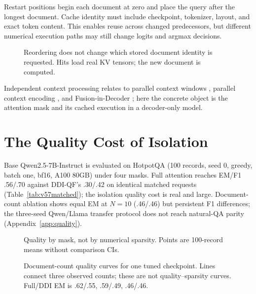 Restart positions begin each document at zero and place the query after
the longest document. Cache identity must include checkpoint, tokenizer,
layout, and exact token content. This enables reuse across changed
predecessors, but different numerical execution paths may still change
logits and argmax decisions.

\begin{figure}[H]
\centering\resizebox{.88\linewidth}{!}{}
\caption{Reordering does not change which stored document identity is
requested. Hits load real KV tensors; the new document is computed.}
\label{fig:requests}
\end{figure}

Independent context processing relates to parallel context windows
\citep{ratner2023pcw}, parallel context encoding \citep{yen2024cepe}, and
Fusion-in-Decoder \citep{izacard2021fid}; here the concrete object is the
attention mask and its cached execution in a decoder-only model.

\section{The Quality Cost of Isolation}
\label{sec:quality}

Base Qwen2.5-7B-Instruct is evaluated on HotpotQA (100 records, seed 0,
greedy, batch one, bf16, A100 80GB) under four masks. Full attention
reaches EM/F1 .56/.70 against DDI-QF's .30/.42 on identical matched
requests (Table~\ref{tab:v57matched}); the isolation quality cost is real
and large. Document-count ablation shows equal EM at $N{=}10$ (.46/.46)
but persistent F1 differences; the three-seed Qwen/Llama transfer protocol
does not reach natural-QA parity (Appendix~\ref{app:quality}).

\begin{figure}[H]
\centering\resizebox{.74\linewidth}{!}{}
\caption{Quality by mask, not by numerical sparsity. Points are 100-record
means without comparison CIs.}
\label{fig:masks}
\end{figure}

\begin{figure}[H]
\centering\resizebox{.74\linewidth}{!}{}
\caption{Document-count quality curves for one tuned checkpoint. Lines
connect three observed counts; these are not quality--sparsity curves.
Full/DDI EM is .62/.55, .59/.49, .46/.46.}
\label{fig:docquality}
\end{figure}

